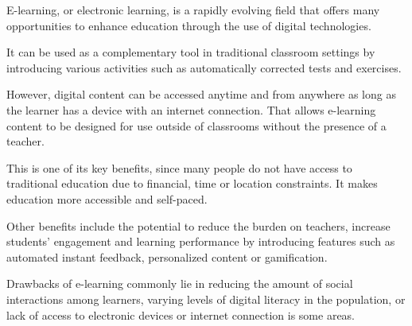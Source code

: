

E-learning, or electronic learning, is a rapidly evolving field that offers many opportunities to enhance education through the use of digital technologies. 

It can be used as a complementary tool in traditional classroom settings by introducing various activities such as automatically corrected tests and exercises. 

However, digital content can be accessed anytime and from anywhere as long as the learner has a device with an internet connection. That allows e-learning content to be designed for use outside of classrooms without the presence of a teacher. 

This is one of its key benefits, since many people do not have access to traditional education due to financial, time or location constraints. It makes education more accessible and self-paced.

Other benefits include the potential to reduce the burden on teachers, increase students' engagement and learning performance by introducing features such as automated instant feedback, personalized content or gamification.

Drawbacks of e-learning commonly lie in reducing the amount of social interactions among learners, varying levels of digital literacy in the population, or lack of access to electronic devices or internet connection is some areas.


